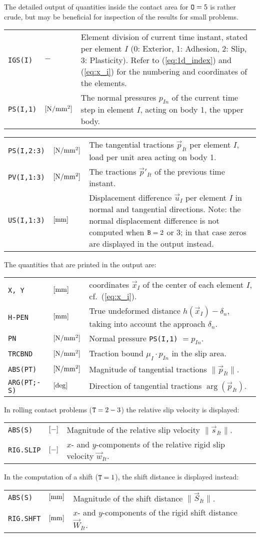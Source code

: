 \documentclass[12pt]{report}
\newenvironment{inputvars}{\vspace{0.4\baselineskip}%

\begin{tabular}{>{\raggedright}p{22mm}p{19mm}p{113mm}}}{
\end{tabular}

}
\newcommand{\inpvar}[3]{{\small\tt #1} & $#2$ & #3 \\[1ex]}
\newcommand{\inpvarw}[3]{\mbox{{\small\tt #1}\hspace{-5mm}} & $#2$ & #3 \\[1ex]}
\newcommand{\inpbreak}{\end{inputvars}\begin{inputvars}}
\begin{document}
The detailed output of quantities inside the contact area for ${\tt O}=5$
is rather crude, but may be beneficial for inspection of the results for
small problems.
\begin{inputvars}
\inpvar{IGS(I)}{-}{Element division of current time instant, stated per
                   element $I$ (0: Exterior, 1: Adhesion, 2: Slip, 3:
                   Plasticity). Refer to (\ref{eq:1d_index}) and
                   (\ref{eq:x_i}) for the numbering and coordinates of the
                   elements.}
\inpvar{PS(I,1)}{\bunit{N/mm^2}}{The normal pressures $p_{In}$ of the current
        time step in element $I$, acting on body 1, the upper body.}
\inpbreak
\inpvar{PS(I,2:3)}{\bunit{N/mm^2}}{The tangential tractions $\vec{p}_{It}$ per
        element $I$, load per unit area acting on body 1.}
\inpvar{PV(I,1:3)}{\bunit{N/mm^2}}{The tractions $\vec{p}'_{It}$ of the previous
        time instant.}
\inpvar{US(I,1:3)}{\bunit{mm}}{Displacement difference $\vec{u}_I$ per element
        $I$ in normal and tangential directions. Note: the normal
        displacement difference is not computed when ${\tt B}=2$ or 3; in
        that case zeros are displayed in the output instead.}
\end{inputvars}
The quantities that are printed in the output are:
\begin{inputvars}
\inpvar{X, Y}{\bunit{mm}}{coordinates $\vec{x}_I$ of the center of each element $I$,
        cf.\ (\ref{eq:x_i}).}
\inpvar{H-PEN}{\bunit{mm}}{True undeformed distance $h(\vec{x}_I)-\delta_n$, taking
        into account the approach $\delta_n$.}
\inpvar{PN}{\bunit{N/mm^2}}{Normal pressure {\tt PS(I,1)} $=p_{In}$.}
\inpvarw{TRCBND}{\bunit{N/mm^2}}{Traction bound $\mu_I\cdot p_{In}$ in the slip
        area.}
\inpvar{ABS(PT)}{\bunit{N/mm^2}}{Magnitude of tangential tractions
        $\| \vec{p}_{It} \|$.}
\inpvar{ARG(PT;-S)}{\bunit{deg}}{Direction of tangential tractions
        $\arg(\vec{p}_{It})$.}
\end{inputvars}
In rolling contact problems (${\tt T}=2-3$) the relative slip velocity is
displayed:
\begin{inputvars}
\inpvar{ABS(S)}{\bunit{-}}{Magnitude of the relative slip velocity
        $\|\vec{s}_{It} \|$.}
\inpvar{RIG.SLIP}{\bunit{-}}{$x$- and $y$-components of the relative rigid slip
        velocity $\vec{w}_{It}$.}
\end{inputvars}
In the computation of a shift (${\tt T}=1$), the shift distance is
displayed instead:
\begin{inputvars}
\inpvar{ABS(S)}{\bunit{mm}}{Magnitude of the shift distance $\| \vec{S}_{It} \|$.}
\inpvar{RIG.SHFT}{\bunit{mm}}{$x$- and $y$-components of the rigid shift distance
        $\vec{W}_{It}$.}
\end{inputvars}
\end{document}
